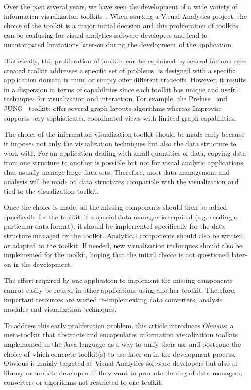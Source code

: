 Over the past several years, we have seen the development of a wide
variety of information visualization toolkits~\cite{InfoVis, Prefuse,
jung2003, Improvise}.  When starting a Visual Analytics project, the
choice of the toolkit is a major initial decision and this
proliferation of toolkits can be confusing for visual analytics
software developers and lead to unanticipated limitations later-on
during the development of the application.

Historically, this proliferation of toolkits can be explained by
several factors: each created toolkit addresses a specific set of
problems, is designed with a specific application domain in mind or
simply offer different tradeoffs.  However, it results in a dispersion
in terms of capabilities since each toolkit has unique and useful
techniques for visualization and interaction.  For example, the
Prefuse~\cite{Prefuse} and JUNG~\cite{jung2003} toolkits offer several
graph layouts algorithms whereas Improvise~\cite{Improvise} supports
very sophisticated coordinated views with limited graph capabilities.

The choice of the information visualization toolkit should be made
early because it imposes not only the visualization techniques but
also the data structure to work with.  For an application dealing with
small quantities of data, copying data from one structure to another
is possible but not for visual analytic applications that usually
manage large data sets.  Therefore, most data-management and analysis
will be made on data structures compatible with the visualization and
tied to the visualization toolkit. 

Once the choice is made, all the missing components should then be
added specifically for the toolkit: if a special data manager is
required (e.g. reading a particular data format), it should be
implemented specifically for the data structure managed by the
toolkit. Analytical components should also be written or adapted to
the toolkit. If needed, new visualization techniques should also be
implemented for the toolkit, hoping that the initial choice is not
questioned later-on in the development.

The effort required by one application to implement the missing
components cannot easily be reused in other applications using another
toolkit.  Therefore, important resources are wasted re-implementing
data converters, analysis modules and visualization techniques. 

To address this early proliferation problem, this article
introduces \emph{Obvious}: a meta-toolkit that abstracts and
encapsulates information visualization toolkits implemented in the
Java language as a way to unify their use and postpone the choice of
which concrete toolkit(s) to use later-on in the development process.
Obvious is mainly targeted at Visual Analytics software developers but
also at library or toolkits developers if they want to promote sharing
of data managers, converters or algorithms not restricted to one
toolkit.

